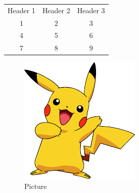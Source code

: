 \documentclass{article}
\begin{document}
\begin{tabular}{c | c | c}
\hline
Header 1 & Header 2 & Header 3 \\
1 & 2 & 3 \\
4 & 5 & 6 \\
7 & 8 & 9 \\
\hline
\end{tabular}

\begin{figure}
\centering
\includegraphics[width=0.5\linewidth]{artifacts/image.png}
\caption{Picture}
\label{fig:enter-label}
\end{figure}
\end{document}
